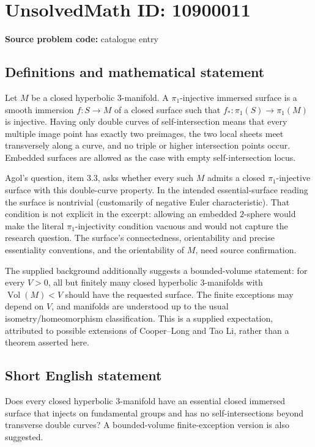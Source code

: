 \documentclass[11pt]{article}
\begin{document}
\section*{UnsolvedMath ID: 10900011}
\textbf{Source problem code:} catalogue entry
\subsection{Definitions and mathematical statement}
Let $M$ be a closed hyperbolic $3$-manifold. A $\pi_1$-injective immersed surface is a smooth immersion $f:S\to M$ of a closed surface such that $f_*:\pi_1(S)\to\pi_1(M)$ is injective. Having only double curves of self-intersection means that every multiple image point has exactly two preimages, the two local sheets meet transversely along a curve, and no triple or higher intersection points occur. Embedded surfaces are allowed as the case with empty self-intersection locus.

Agol's question, item 3.3, asks whether every such $M$ admits a closed $\pi_1$-injective surface with this double-curve property. In the intended essential-surface reading the surface is nontrivial (customarily of negative Euler characteristic). That condition is not explicit in the excerpt: allowing an embedded $2$-sphere would make the literal $\pi_1$-injectivity condition vacuous and would not capture the research question. The surface's connectedness, orientability and precise essentiality conventions, and the orientability of $M$, need source confirmation.

The supplied background additionally suggests a bounded-volume statement: for every $V>0$, all but finitely many closed hyperbolic $3$-manifolds with $\operatorname{Vol}(M)<V$ should have the requested surface. The finite exceptions may depend on $V$, and manifolds are understood up to the usual isometry/homeomorphism classification. This is a supplied expectation, attributed to possible extensions of Cooper--Long and Tao Li, rather than a theorem asserted here.
\subsection{Short English statement}
Does every closed hyperbolic $3$-manifold have an essential closed immersed surface that injects on fundamental groups and has no self-intersections beyond transverse double curves? A bounded-volume finite-exception version is also suggested.
\end{document}
